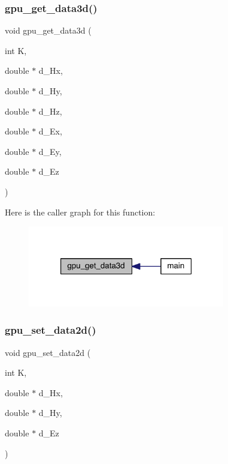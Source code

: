 \mbox{\label{a00554_aa1ecfe5bfbcdb9a59cb6c3c39f62f744}} 
\subsubsection{\texorpdfstring{gpu\+\_\+get\+\_\+data3d()}{gpu\_get\_data3d()}}
{\footnotesize\ttfamily void gpu\+\_\+get\+\_\+data3d (\begin{DoxyParamCaption}\item[{int}]{K,  }\item[{double $\ast$}]{d\+\_\+\+Hx,  }\item[{double $\ast$}]{d\+\_\+\+Hy,  }\item[{double $\ast$}]{d\+\_\+\+Hz,  }\item[{double $\ast$}]{d\+\_\+\+Ex,  }\item[{double $\ast$}]{d\+\_\+\+Ey,  }\item[{double $\ast$}]{d\+\_\+\+Ez }\end{DoxyParamCaption})}

Here is the caller graph for this function\+:\nopagebreak
\begin{figure}[H]
\begin{center}
\leavevmode
\includegraphics[width=244pt]{a00554_aa1ecfe5bfbcdb9a59cb6c3c39f62f744_icgraph}
\end{center}
\end{figure}
\mbox{\label{a00554_a47b4375211682db69a53012631fb2ee7}} 
\subsubsection{\texorpdfstring{gpu\+\_\+set\+\_\+data2d()}{gpu\_set\_data2d()}}
{\footnotesize\ttfamily void gpu\+\_\+set\+\_\+data2d (\begin{DoxyParamCaption}\item[{int}]{K,  }\item[{double $\ast$}]{d\+\_\+\+Hx,  }\item[{double $\ast$}]{d\+\_\+\+Hy,  }\item[{double $\ast$}]{d\+\_\+\+Ez }\end{DoxyParamCaption})}

